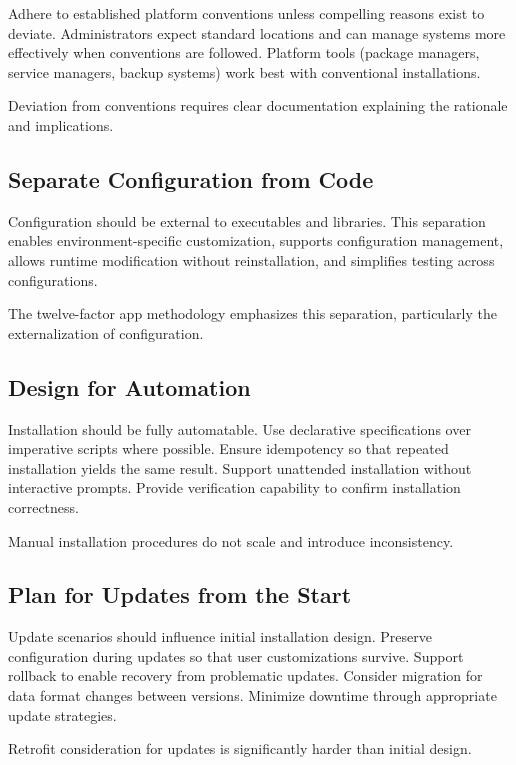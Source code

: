 \documentclass[11pt]{article}
\begin{document}
Adhere to established platform conventions unless compelling reasons exist to deviate. Administrators expect standard locations and can manage systems more effectively when conventions are followed. Platform tools (package managers, service managers, backup systems) work best with conventional installations.

Deviation from conventions requires clear documentation explaining the rationale and implications.

\subsection{Separate Configuration from Code}

Configuration should be external to executables and libraries. This separation enables environment-specific customization, supports configuration management, allows runtime modification without reinstallation, and simplifies testing across configurations.

The twelve-factor app methodology emphasizes this separation, particularly the externalization of configuration.

\subsection{Design for Automation}

Installation should be fully automatable. Use declarative specifications over imperative scripts where possible. Ensure idempotency so that repeated installation yields the same result. Support unattended installation without interactive prompts. Provide verification capability to confirm installation correctness.

Manual installation procedures do not scale and introduce inconsistency.

\subsection{Plan for Updates from the Start}

Update scenarios should influence initial installation design. Preserve configuration during updates so that user customizations survive. Support rollback to enable recovery from problematic updates. Consider migration for data format changes between versions. Minimize downtime through appropriate update strategies.

Retrofit consideration for updates is significantly harder than initial design.
\end{document}
